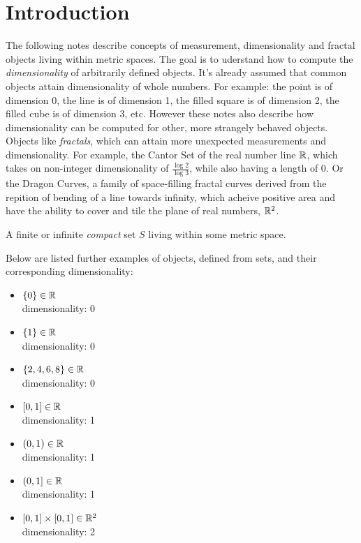 \documentclass[11pt]{ekblite}
\begin{document}
\section{Introduction}
The following notes describe concepts of measurement, dimensionality and fractal objects living within metric spaces. The goal is to uderstand how to compute the \textit{dimensionality} of arbitrarily defined objects. It's already assumed that common objects attain dimensionality of whole numbers. For example: the point is of dimension 0, the line is of dimension 1, the filled square is of dimension 2, the filled cube is of dimension 3, etc. However these notes also describe how dimensionality can be computed for other, more strangely behaved objects. Objects like \textit{fractals}, which can attain more unexpected measurements and dimensionality. For example, the Cantor Set of the real number line $\mathbb{R}$, which takes on non-integer dimensionality of $\frac{\log 2}{\log 3}$, while also having a length of 0. Or the Dragon Curves, a family of space-filling fractal curves derived from the repition of bending of a line towards infinity, which acheive positive area and have the ability to cover and tile the plane of real numbers, $\mathbb{R}^2$.
\begin{definition}[Object]
	A finite or infinite \textit{compact} set $S$ living within some metric space.
\end{definition}
Below are listed further examples of objects, defined from sets, and their corresponding dimensionality:
\begin{itemize}
	\item $\{0\} \in \mathbb{R}$ \\[0.1in] dimensionality: 0
	\item $\{1\} \in \mathbb{R}$ \\[0.1in] dimensionality: 0
	\item $\{2,4,6,8\} \in \mathbb{R}$ \\[0.1in] dimensionality: 0
	\item $[0,1] \in \mathbb{R}$ \\[0.1in] dimensionality: 1
	\item $(0,1) \in \mathbb{R}$ \\[0.1in] dimensionality: 1
	\item $(0,1] \in \mathbb{R}$ \\[0.1in] dimensionality: 1
	\item  $[0,1] \times [0,1] \in \mathbb{R}^2$ \\[0.1in] dimensionality: 2
\end{itemize}
\end{document}
